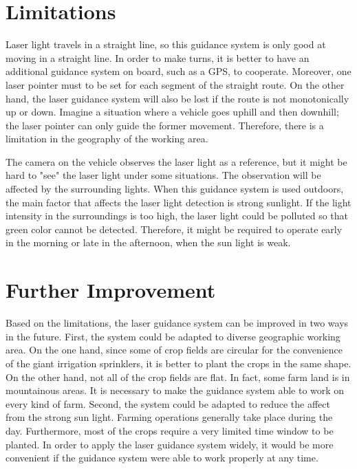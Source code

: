 \section{Limitations}
Laser light travels in a straight line, so this guidance system is only good at moving in a straight line. In order to make turns, it is better to have an additional guidance system on board, such as a GPS, to cooperate. Moreover, one laser pointer must to be set for each segment of the straight route. On the other hand, the laser guidance system will also be lost if the route is not monotonically up or down. Imagine a situation where a vehicle goes uphill and then downhill; the laser pointer can only guide the former movement. Therefore, there is a limitation in the geography of the working area.

The camera on the vehicle observes the laser light as a reference, but it might be hard to "see" the laser light under some situations. The observation will be affected by the surrounding lights. When this guidance system is used outdoors, the main factor that affects the laser light detection is strong sunlight. If the light intensity in the surroundings is too high, the laser light could be polluted so that green color cannot be detected. Therefore, it might be required to operate early in the morning or late in the afternoon, when the sun light is weak. 

\section{Further Improvement}
Based on the limitations, the laser guidance system can be improved in two ways in the future. First, the system could be adapted to diverse geographic working area. On the one hand, since some of crop fields are circular for the convenience of the giant irrigation sprinklers, it is better to plant the crops in the same shape. On the other hand, not all of the crop fields are flat. In fact, some farm land is in mountainous areas. It is necessary to make the guidance system able to work on every kind of farm. Second, the system could be adapted to reduce the affect from the strong sun light. Farming operations generally take place during the day. Furthermore, most of the crops require a very limited time window to be planted. In order to apply the laser guidance system widely, it would be more convenient if the guidance system were able to work properly at any time. 